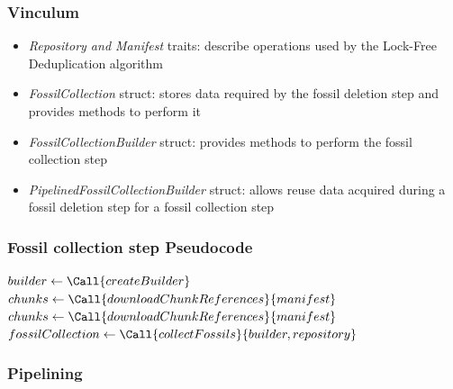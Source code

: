 \documentclass[english,utf8,aspectratio=169]{beamer}
\begin{document}
    \begin{frame}
        \frametitle{Vinculum}
        \begin{itemize}
            \item \textit{Repository and Manifest} traits: describe operations
                used by the Lock-Free Deduplication algorithm
            \item \textit{FossilCollection} struct: stores data required by the
                fossil deletion step and provides methods to perform it
            \item \textit{FossilCollectionBuilder} struct: provides methods to perform
                the fossil collection step
            \item \textit{PipelinedFossilCollectionBuilder} struct: allows reuse data
                acquired during a fossil deletion step for a fossil collection step
        \end{itemize}
    \end{frame}

    \begin{frame}
        \frametitle{Fossil collection step Pseudocode}
        {
            \small
            \begin{algorithmic}[1]
                \State $builder \gets \Call{createBuilder}$
                        \State $chunks \gets \Call{downloadChunkReferences}{manifest}$
                        \State {}
                        \State {}
                    \EndIf
                \EndFor
                    \State $chunks \gets \Call{downloadChunkReferences}{manifest}$
                    \State {}
                \EndFor
                \State $fossilCollection \gets \Call{collectFossils}{builder, repository}$
                \State {}
            \end{algorithmic}
        }
    \end{frame}

    \begin{frame}
        \frametitle{Pipelining}
        \begin{center}
            
        \end{center}
    \end{frame}
\end{document}
